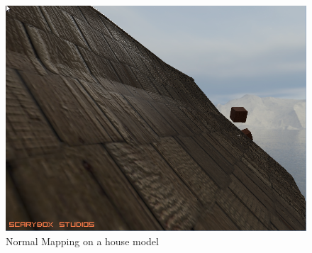 \begin{figure}[h]
    \centering
    \includegraphics[scale=0.4,clip=true]{./image/nm2.png}
    \caption{Normal Mapping on a house model}
\end{figure}

\newpage
